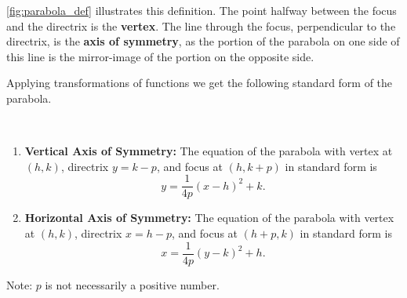 \autoref{fig:parabola_def} illustrates this definition. The point halfway between the focus and the directrix is the \textbf{vertex}. The line through the focus, perpendicular to the directrix, is the \textbf{axis of symmetry}, as the portion of the parabola on one side of this line is the mirror-image of the portion on the opposite side.

\iftoggle{abridgeConics}{%
The geometric definition of the parabola and distance formula can be used to derive the quadratic function whose graph is a parabola with vertex at the origin.
\[y=\frac{1}{4p}x^2.\]
}{%
The definition leads us to an algebraic formula for the parabola. Let $P=(x,y)$ be a point on a parabola whose focus is at $F=(0,p)$ and whose directrix is at $y=-p$. (We'll assume for now that the focus lies on the $y$-axis; by placing the focus $p$ units above the $x$-axis and the directrix $p$ units below this axis, the vertex will be at $(0,0)$.)

We use the Distance Formula to find the distance $d_1$ between $F$ and $P$:
\[d_1=\sqrt{(x-0)^2+(y-p)^2}.\]
The distance $d_2$ from $P$ to the directrix is more straightforward:
\[d_2=y-(-p) = y+p.\]
These two distances are equal. Setting $d_1=d_2$, we can solve for $y$ in terms of $x$:
\begin{align*}
	d_1&= d_2 \\
	\sqrt{x^2+(y-p)^2} &= y+p 
	\intertext{Now square both sides.}
	x^2+(y-p)^2 &= (y+p)^2 \\
	x^2+y^2-2yp+p^2 &= y^2+2yp+p^2\\
	x^2 &=4yp\\
	y&= \frac{1}{4p}x^2.
\end{align*}%
}
Applying transformations of functions we get the following standard form of the parabola.

\begin{keyidea}\label{idea:parabola}%
\mbox{}\\[-1.5\baselineskip]\parbox{\linewidth}{%
\begin{enumerate}
	\item	\textbf{Vertical Axis of Symmetry:} The equation of the parabola with vertex at $(h,k)$, directrix $y=k-p$, and focus at $(h,k+p)$ in standard form is \[y=\frac{1}{4p}(x-h)^2+k.\]
	\item	\textbf{Horizontal Axis of Symmetry:} The  equation of the parabola with vertex at $(h,k)$, directrix $x=h-p$, and focus at $(h+p,k)$ in standard form is \[x=\frac{1}{4p}(y-k)^2+h.\]
\end{enumerate}}
Note: $p$ is not necessarily a positive number.
\end{keyidea}

